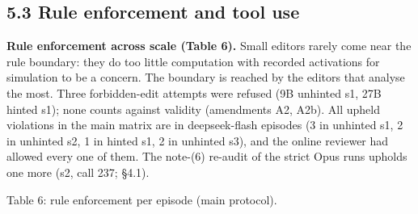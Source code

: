 \documentclass[
  10pt,
]{article}
\newcounter{none} %
\begin{document}
\subsection{5.3 Rule enforcement and tool
use}\label{rule-enforcement-and-tool-use}

\textbf{Rule enforcement across scale (Table 6).} Small editors rarely
come near the rule boundary: they do too little computation with
recorded activations for simulation to be a concern. The boundary is
reached by the editors that analyse the most. Three forbidden-edit
attempts were refused (9B unhinted s1, 27B hinted s1); none counts
against validity (amendments A2, A2b). All upheld violations in the main
matrix are in deepseek-flash episodes (3 in unhinted s1, 2 in unhinted
s2, 1 in hinted s1, 2 in unhinted s3), and the online reviewer had
allowed every one of them. The note-(6) re-audit of the strict Opus runs
upholds one more (s2, call 237; \S{}4.1).

Table 6: rule enforcement per episode (main protocol).
\end{document}
